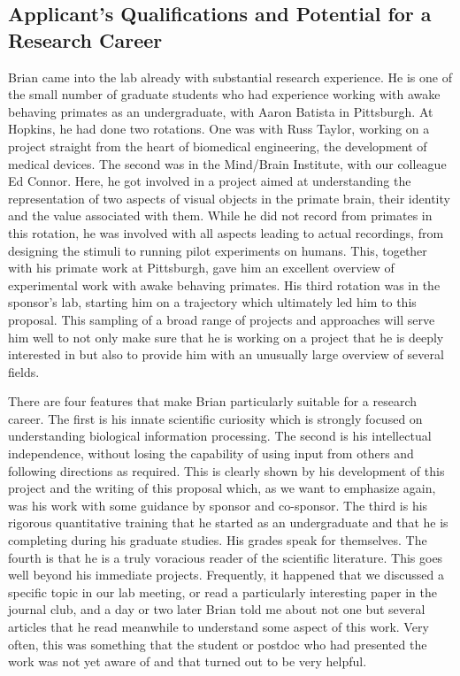 \documentclass[11pt,notitlepage]{article}
\begin{document}
\subsection*{Applicant's Qualifications and Potential for a Research
  Career}

Brian came into the lab already with substantial research
experience. He is one of the small number of graduate students who had
experience working with awake behaving primates as an undergraduate,
with Aaron Batista in Pittsburgh. At Hopkins, he had done two
rotations. One was with Russ Taylor, working on a project straight
from the heart of biomedical engineering, the development of medical
devices. The second was in the Mind/Brain Institute, with our
colleague Ed Connor. Here, he got involved in a project aimed at
understanding the representation of two aspects of visual objects in
the primate brain, their identity and the value associated with
them. While he did not record from primates in this rotation, he was
involved with all aspects leading to actual recordings, from designing
the stimuli to running pilot experiments on humans. This, together
with his primate work at Pittsburgh, gave him an excellent overview of
experimental work with awake behaving primates.  His third rotation
was in the sponsor's lab, starting
him
on a trajectory which ultimately led him to
this proposal.  This sampling of a broad range of projects and
approaches will serve him well to not only make sure that he is
working on a project that he is deeply interested in but also
to
provide
him with an unusually large overview of several fields. 

There are four features that make Brian particularly suitable for a
research career. The first is his innate scientific curiosity which is
strongly focused on understanding biological information
processing. The second is his intellectual independence, without
losing the capability of using input from others and following
directions as required. This is clearly shown by his development of
this project and the writing of this 
proposal
 which, as we want to
emphasize again, was his work with some guidance by sponsor and
co-sponsor. The third is his rigorous quantitative training that he
started as an undergraduate and that he is completing during his graduate
studies. His grades speak for themselves. The fourth is that he is a truly
voracious reader of the scientific literature. This goes well beyond
his immediate projects. Frequently, it happened that we discussed a
specific topic in our lab meeting, or read a particularly interesting
paper in the journal club, and a day or two later Brian told me about
not one but several articles that he read meanwhile to understand some
aspect of this work. Very often, this was something that the student
or postdoc who had presented the work was not yet aware of and that
turned out to be very helpful. 
\end{document}
